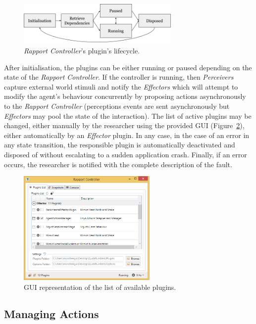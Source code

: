 \begin{figure}[H]
	\centering
	\includegraphics[width=0.7\textwidth]{images/PluginsLifecycle.png}
	\caption{\textit{Rapport Controller}'s plugin's lifecycle.}
	\label{fig:pluginLifecycle}
\end{figure}

After initialisation, the plugins can be either running or paused depending on the state of the \textit{Rapport Controller}. If the controller is running, then \textit{Perceivers} capture external world stimuli and notify the \textit{Effectors} which will attempt to modify the agent's behaviour concurrently by proposing actions asynchronously to the \textit{Rapport Controller} (perceptions events are sent asynchronously but \textit{Effectors} may pool the state of the interaction). The list of active plugins may be changed, either manually by the researcher using the provided \ac{GUI} (Figure~\ref{fig:pluginList}), either automatically by an \textit{Effector} plugin. In any case, in the case of an error in any state transition, the responsible plugin is automatically deactivated and disposed of without escalating to a sudden application crash. Finally, if an error occurs, the researcher is notified with the complete description of the fault.

\begin{figure}[H]
	\centering
	\includegraphics[width=0.6\textwidth]{images/PluginsList.png}
	\caption{\ac{GUI} representation of the list of available plugins.}
	\label{fig:pluginList}
\end{figure}

\subsection{Managing Actions}
\label{sub:sec:managingActions}

